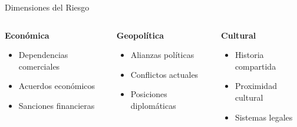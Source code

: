 \documentclass{beamer}
\begin{document}
\begin{frame}{Dimensiones del Riesgo}
    \begin{columns}[t]
        \begin{column}{0.33\textwidth}
            \textbf{Económica}
            \begin{itemize}
                \item Dependencias comerciales
                \item Acuerdos económicos
                \item Sanciones financieras
            \end{itemize}
        \end{column}
        \begin{column}{0.33\textwidth}
            \textbf{Geopolítica}
            \begin{itemize}
                \item Alianzas políticas
                \item Conflictos actuales
                \item Posiciones diplomáticas
            \end{itemize}
        \end{column}
        \begin{column}{0.33\textwidth}
            \textbf{Cultural}
            \begin{itemize}
                \item Historia compartida
                \item Proximidad cultural
                \item Sistemas legales
            \end{itemize}
        \end{column}
    \end{columns}
\end{frame}
\end{document}
